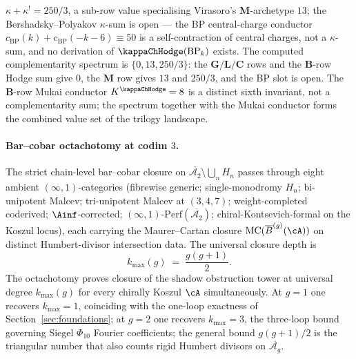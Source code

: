 $\kappa + \kappa^! = 250/3$, a sub-row value specialising
Virasoro's $\mathbf{M}$-archetype $13$; the Bershadsky--Polyakov
$\kappa$-sum is open — the BP central-charge conductor
$c_{\mathrm{BP}}(k) + c_{\mathrm{BP}}(-k-6) \equiv 50$ is a
self-contraction of central charges, not a $\kappa$-sum, and no
derivation of $\kappaChHodge(\mathrm{BP}_k)$ exists.
The computed complementarity spectrum is $\{0, 13, 250/3\}$:
the $\mathbf{G}/\mathbf{L}/\mathbf{C}$ rows and the
$\mathbf{B}$-row Hodge sum give $0$, the $\mathbf{M}$ row gives
$13$ and $250/3$, and the BP slot is open. The $\mathbf{B}$-row
Mukai conductor $K^{\kappaChHodge}=8$ is a distinct sixth
invariant, not a complementarity sum; the spectrum together with
the Mukai conductor forms the combined value set of the trilogy
landscape.

\paragraph{Bar--cobar octachotomy at codim $3$.}
The strict chain-level bar--cobar closure on
$\overline{\mathcal A_2} \setminus \bigcup_n H_n$ passes through
eight ambient $(\infty,1)$-categories (fibrewise generic;
single-monodromy $H_n$; bi-unipotent Malcev; tri-unipotent Malcev
at $(3,4,7)$; weight-completed coderived; $\Ainf$-corrected;
$(\infty,1)$-$\mathrm{Perf}(\overline{\mathcal A_2})$;
chiral-Kontsevich-formal on the Koszul locus), each carrying the
Maurer--Cartan closure $\mathrm{MC}(\overline B^{(g)}(\cA))$ on
distinct Humbert-divisor intersection data. The universal closure
depth is
\[
 k_{\max}(g)
 \;=\;
 \frac{g(g+1)}{2}.
\]
The octachotomy proves closure of the shadow obstruction tower
at universal degree $k_{\max}(g)$ for every chirally Koszul
$\cA$ simultaneously. At $g = 1$ one recovers $k_{\max} = 1$,
coinciding with the one-loop exactness of
Section~\ref{sec:foundations}; at $g = 2$ one recovers
$k_{\max} = 3$, the three-loop bound governing Siegel
$\Phi_{10}$ Fourier coefficients; the general bound
$g(g+1)/2$ is the triangular number that also counts rigid
Humbert divisors on $\overline{\mathcal A_g}$.

